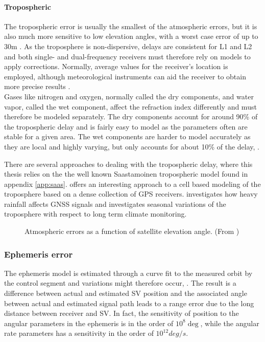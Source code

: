 \paragraph{Tropospheric}
The tropospheric error is usually the smallest of the atmospheric errors, but it is also much more sensitive to low elevation angles, with a worst case error of up to 30m \cite{farrell2008aided}. As the troposphere is non-dispersive, delays are consistent for L1 and L2 and both single- and dual-frequency receivers must therefore rely on models to apply corrections. Normally, average values for the receiver's location is employed, although meteorological instruments can aid the receiver to obtain more precise results \cite{farrell2008aided}. \\

Gases like nitrogen and oxygen, normally called the dry components, and water vapor, called the wet component, affect the refraction index differently and must therefore be modeled separately. The dry components account for around 90\% of the tropospheric delay and is fairly easy to model as the parameters often are stable for a given area. The wet components are harder to model accurately as they are local and highly varying, but only accounts for about 10\% of the delay, \cite{farrell2008aided, groves2013principles}. 

There are several approaches to dealing with the tropospheric delay, where this thesis relies on the the well known Saastamoinen tropospheric model found in appendix \ref{app:saas}. \cite{hirahara2000local} offers an interesting approach to a cell based modeling of the troposphere based on a dense collection of GPS receivers. \cite{priego2017monitoring} investigates how heavy rainfall affects GNSS signals and \cite{baldysz2016comparison} investigates seasonal variations of the troposphere with respect to long term climate monitoring.

\begin{figure}[!htbp]
	\centering
    \caption[Relation between atmospheric errors and elevation]{Atmospheric errors as a function of satellite elevation angle. (From \cite{groves2013principles})}
    \label{fig:atmo_elev_error}
\end{figure}

\subsubsection{Ephemeris error}
\label{sec:eph_error}
The ephemeris model is estimated through a curve fit to the measured orbit by the control segment and variations might therefore occur, \cite{farrell2008aided}. The result is a difference between actual and estimated SV position and the associated angle between actual and estimated signal path leads to a range error due to the long distance between receiver and SV. In fact, the sensitivity of position to the angular parameters in the ephemeris is in the order of $10^8 \deg$, while the angular rate parameters has a sensitivity in the order of $10^{12}deg/s$. 

